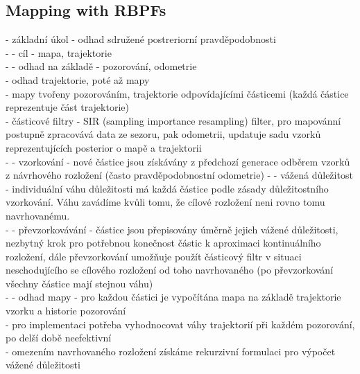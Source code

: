 \documentclass[11pt]{article}
\begin{document}
\subsection{Mapping with RBPFs}
- základní úkol - odhad sdružené postreriorní pravděpodobnosti\\
- - cíl - mapa, trajektorie\\
- - odhad na základě - pozorování, odometrie\\
- odhad trajektorie, poté až mapy\\
- mapy tvořeny pozorováním, trajektorie odpovídajícími částicemi (každá částice reprezentuje část trajektorie)\\
- částicové filtry - SIR (sampling importance resampling) filter, pro mapovánní postupně zpracovává data ze sezoru, pak odometrii, updatuje sadu vzorků reprezentujících posterior o mapě a trajektorii\\
- - vzorkování - nové částice jsou získávány z předchozí generace odběrem vzorků z návrhového rozložení (často pravděpodobnostní odometrie) 
- - vážená důležitost - individuální váhu důležitosti má každá částice podle zásady důležitostního vzorkování. Váhu zavádíme kvůli tomu, že cílové rozložení neni rovno tomu navrhovanému.\\
- - převzorkovávání - částice jsou přepisovány úměrně jejich vážené důležitosti, nezbytný krok pro potřebnou konečnost částic k aproximaci kontinuálního rozložení, dále převzorkování umožňuje použít částicový filtr v situaci neschodujícího se cílového rozložení od toho navrhovaného (po převzorkování všechny částice mají stejnou váhu)\\
- - odhad mapy - pro každou částici je vypočítána mapa na základě trajektorie vzorku a historie pozorování\\
- pro implementaci potřeba vyhodnocovat váhy trajektorií při každém pozorování, po delší době neefektivní\\
- omezením navrhovaného rozložení získáme rekurzivní formulaci pro výpočet vážené důležitosti\\
\end{document}
